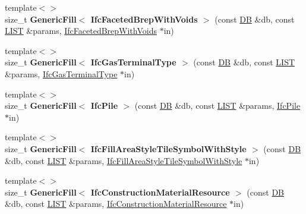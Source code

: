 \begin{DoxyCompactItemize}
\item 
\hypertarget{namespace_assimp_1_1_s_t_e_p_aba7644720cb67f4a60c2cd321207be91}{{\footnotesize template$<$$>$ }\\size\+\_\+t {\bfseries Generic\+Fill$<$ Ifc\+Faceted\+Brep\+With\+Voids $>$} (const \hyperlink{class_assimp_1_1_s_t_e_p_1_1_d_b}{D\+B} \&db, const \hyperlink{class_assimp_1_1_s_t_e_p_1_1_e_x_p_r_e_s_s_1_1_l_i_s_t}{L\+I\+S\+T} \&params, \hyperlink{struct_assimp_1_1_i_f_c_1_1_ifc_faceted_brep_with_voids}{Ifc\+Faceted\+Brep\+With\+Voids} $\ast$in)}\label{namespace_assimp_1_1_s_t_e_p_aba7644720cb67f4a60c2cd321207be91}

\item 
\hypertarget{namespace_assimp_1_1_s_t_e_p_affc41b5cbfa4cabea4f004d39c19ed39}{{\footnotesize template$<$$>$ }\\size\+\_\+t {\bfseries Generic\+Fill$<$ Ifc\+Gas\+Terminal\+Type $>$} (const \hyperlink{class_assimp_1_1_s_t_e_p_1_1_d_b}{D\+B} \&db, const \hyperlink{class_assimp_1_1_s_t_e_p_1_1_e_x_p_r_e_s_s_1_1_l_i_s_t}{L\+I\+S\+T} \&params, \hyperlink{struct_assimp_1_1_i_f_c_1_1_ifc_gas_terminal_type}{Ifc\+Gas\+Terminal\+Type} $\ast$in)}\label{namespace_assimp_1_1_s_t_e_p_affc41b5cbfa4cabea4f004d39c19ed39}

\item 
\hypertarget{namespace_assimp_1_1_s_t_e_p_acff3b65f9ecfdf654b288f84c84c682d}{{\footnotesize template$<$$>$ }\\size\+\_\+t {\bfseries Generic\+Fill$<$ Ifc\+Pile $>$} (const \hyperlink{class_assimp_1_1_s_t_e_p_1_1_d_b}{D\+B} \&db, const \hyperlink{class_assimp_1_1_s_t_e_p_1_1_e_x_p_r_e_s_s_1_1_l_i_s_t}{L\+I\+S\+T} \&params, \hyperlink{struct_assimp_1_1_i_f_c_1_1_ifc_pile}{Ifc\+Pile} $\ast$in)}\label{namespace_assimp_1_1_s_t_e_p_acff3b65f9ecfdf654b288f84c84c682d}

\item 
\hypertarget{namespace_assimp_1_1_s_t_e_p_a91126e6ecdcf2b4b08ae04b70fcdf66c}{{\footnotesize template$<$$>$ }\\size\+\_\+t {\bfseries Generic\+Fill$<$ Ifc\+Fill\+Area\+Style\+Tile\+Symbol\+With\+Style $>$} (const \hyperlink{class_assimp_1_1_s_t_e_p_1_1_d_b}{D\+B} \&db, const \hyperlink{class_assimp_1_1_s_t_e_p_1_1_e_x_p_r_e_s_s_1_1_l_i_s_t}{L\+I\+S\+T} \&params, \hyperlink{struct_assimp_1_1_i_f_c_1_1_ifc_fill_area_style_tile_symbol_with_style}{Ifc\+Fill\+Area\+Style\+Tile\+Symbol\+With\+Style} $\ast$in)}\label{namespace_assimp_1_1_s_t_e_p_a91126e6ecdcf2b4b08ae04b70fcdf66c}

\item 
\hypertarget{namespace_assimp_1_1_s_t_e_p_a4e7fcd69495f6494a7db0d3ec2548432}{{\footnotesize template$<$$>$ }\\size\+\_\+t {\bfseries Generic\+Fill$<$ Ifc\+Construction\+Material\+Resource $>$} (const \hyperlink{class_assimp_1_1_s_t_e_p_1_1_d_b}{D\+B} \&db, const \hyperlink{class_assimp_1_1_s_t_e_p_1_1_e_x_p_r_e_s_s_1_1_l_i_s_t}{L\+I\+S\+T} \&params, \hyperlink{struct_assimp_1_1_i_f_c_1_1_ifc_construction_material_resource}{Ifc\+Construction\+Material\+Resource} $\ast$in)}\label{namespace_assimp_1_1_s_t_e_p_a4e7fcd69495f6494a7db0d3ec2548432}


\end{DoxyCompactItemize}
